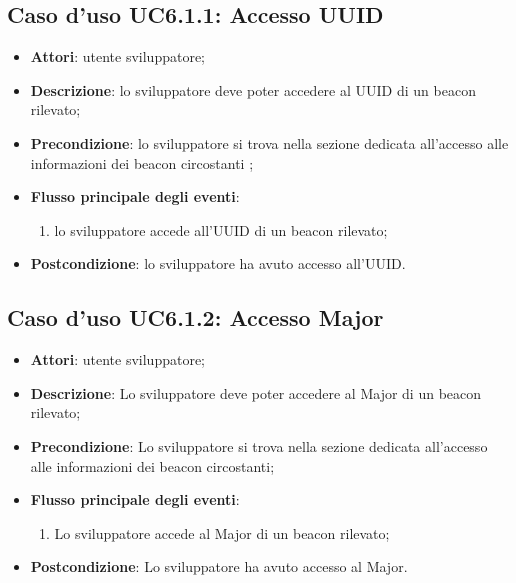 \documentclass[../AnalisiDeiRequisiti.tex]{subfiles}
\begin{document}
\subsection{Caso d'uso UC6.1.1: Accesso UUID}
\begin{itemize}
\item \textbf{Attori}: utente sviluppatore;
\item \textbf{Descrizione}: lo sviluppatore deve poter accedere al UUID di un beacon rilevato; 
      \item \textbf{Precondizione}: lo sviluppatore si trova nella sezione dedicata all'accesso alle informazioni dei beacon circostanti ;

        \item \textbf{Flusso principale degli eventi}:
          \begin{enumerate}
          \item lo sviluppatore accede all'UUID di un beacon rilevato;

      \end{enumerate}
    \item \textbf{Postcondizione}: lo sviluppatore ha avuto accesso all'UUID.
  \end{itemize}
\hypertarget{UC6.1.2}{}
\subsection{Caso d'uso UC6.1.2: Accesso Major}
\begin{itemize}
\item \textbf{Attori}: utente sviluppatore;
\item \textbf{Descrizione}: Lo sviluppatore deve poter accedere al Major di un beacon rilevato; 
      \item \textbf{Precondizione}: Lo sviluppatore si trova nella sezione dedicata all'accesso alle informazioni dei beacon circostanti;

        \item \textbf{Flusso principale degli eventi}:
          \begin{enumerate}
          \item Lo sviluppatore accede al Major di un beacon rilevato;

      \end{enumerate}
    \item \textbf{Postcondizione}: Lo sviluppatore ha avuto accesso al Major.
  \end{itemize}
\hypertarget{UC6.1.3}{}
\end{document}
